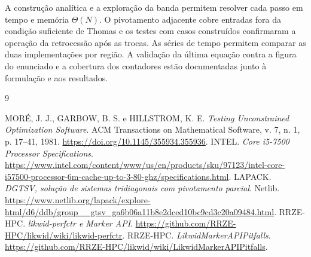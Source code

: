 \documentclass[11pt,a4paper]{article}
\begin{document}
A construção analítica e a exploração da banda permitem resolver cada passo em tempo e memória $\Theta(N)$. O pivotamento adjacente cobre entradas fora da condição suficiente de Thomas e os testes com casos construídos confirmaram a operação da retrocessão após as trocas. As séries de tempo permitem comparar as duas implementações por região. A validação da última equação contra a figura do enunciado e a cobertura dos contadores estão documentadas junto à formulação e aos resultados.

\begin{thebibliography}{9}
\raggedright
{} MORÉ, J. J., GARBOW, B. S. e HILLSTROM, K. E. \emph{Testing Unconstrained Optimization Software}. ACM Transactions on Mathematical Software, v. 7, n. 1, p. 17--41, 1981. \url{https://doi.org/10.1145/355934.355936}.
 INTEL. \emph{Core i5-7500 Processor Specifications}. \url{https://www.intel.com/content/www/us/en/products/sku/97123/intel-core-i57500-processor-6m-cache-up-to-3-80-ghz/specifications.html}.
 LAPACK. \emph{DGTSV, solução de sistemas tridiagonais com pivotamento parcial}. Netlib. \url{https://www.netlib.org/lapack/explore-html/d6/ddb/group__gtsv_ga6b06a11b8e2dced10bc9cd3c20a09484.html}.
 RRZE-HPC. \emph{likwid-perfctr e Marker API}. \url{https://github.com/RRZE-HPC/likwid/wiki/likwid-perfctr}.
 RRZE-HPC. \emph{LikwidMarkerAPIPitfalls}. \url{https://github.com/RRZE-HPC/likwid/wiki/LikwidMarkerAPIPitfalls}.
\end{thebibliography}
\end{document}
